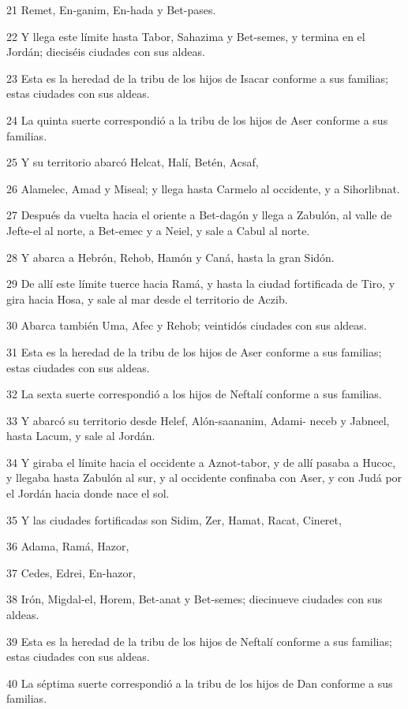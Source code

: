 \par 21 Remet, En-ganim, En-hada y Bet-pases.
\par 22 Y llega este límite hasta Tabor, Sahazima y Bet-semes, y termina en el Jordán; dieciséis ciudades con sus aldeas.
\par 23 Esta es la heredad de la tribu de los hijos de Isacar conforme a sus familias; estas ciudades con sus aldeas.
\par 24 La quinta suerte correspondió a la tribu de los hijos de Aser conforme a sus familias.
\par 25 Y su territorio abarcó Helcat, Halí, Betén, Acsaf,
\par 26 Alamelec, Amad y Miseal; y llega hasta Carmelo al occidente, y a Sihorlibnat.
\par 27 Después da vuelta hacia el oriente a Bet-dagón y llega a Zabulón, al valle de Jefte-el al norte, a Bet-emec y a Neiel, y sale a Cabul al norte.
\par 28 Y abarca a Hebrón, Rehob, Hamón y Caná, hasta la gran Sidón.
\par 29 De allí este límite tuerce hacia Ramá, y hasta la ciudad fortificada de Tiro, y gira hacia Hosa, y sale al mar desde el territorio de Aczib.
\par 30 Abarca también Uma, Afec y Rehob; veintidós ciudades con sus aldeas.
\par 31 Esta es la heredad de la tribu de los hijos de Aser conforme a sus familias; estas ciudades con sus aldeas.
\par 32 La sexta suerte correspondió a los hijos de Neftalí conforme a sus familias.
\par 33 Y abarcó su territorio desde Helef, Alón-saananim, Adami- neceb y Jabneel, hasta Lacum, y sale al Jordán.
\par 34 Y giraba el límite hacia el occidente a Aznot-tabor, y de allí pasaba a Hucoc, y llegaba hasta Zabulón al sur, y al occidente confinaba con Aser, y con Judá por el Jordán hacia donde nace el sol.
\par 35 Y las ciudades fortificadas son Sidim, Zer, Hamat, Racat, Cineret,
\par 36 Adama, Ramá, Hazor,
\par 37 Cedes, Edrei, En-hazor,
\par 38 Irón, Migdal-el, Horem, Bet-anat y Bet-semes; diecinueve ciudades con sus aldeas.
\par 39 Esta es la heredad de la tribu de los hijos de Neftalí conforme a sus familias; estas ciudades con sus aldeas.
\par 40 La séptima suerte correspondió a la tribu de los hijos de Dan conforme a sus familias.
